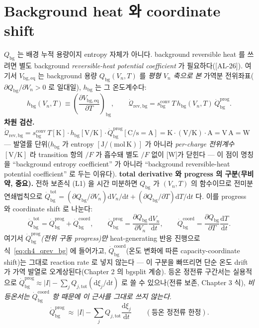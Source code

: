 \documentclass[11pt,a4paper]{article}
\newcommand{\dd}{\mathrm{d}}
\newcommand{\eq}{\mathrm{eq}}
\newcommand{\bg}{\mathrm{bg}}
\newcommand{\tot}{\mathrm{tot}}
\newcommand{\rev}{\mathrm{rev}}
\newcommand{\conv}{\mathrm{conv}}
\newcommand{\prog}{\mathrm{prog}}
\newcommand{\coord}{\mathrm{coord}}
\newcommand{\AL}[1]{\textsf{[AL-#1]}}
\begin{document}
\section{Background heat 와 coordinate shift}\label{sec:ch4_bg}
$Q_\bg$ 는 배경 누적 용량이지 entropy 자체가 아니다. background reversible heat 를 쓰려면 별도 background
\emph{reversible-heat potential coefficient} 가 필요하다(\AL{26}). 여기서 $V_{\bg,\eq}$ 는 background 용량
$Q_\bg(V_n,T)$ 를 \emph{평형 $V_n$ 축으로 본} 가역분 전위좌표($\partial Q_\bg/\partial V_n>0$ 로 일대일), $h_\bg$
는 그 온도계수다:
\begin{equation}
h_\bg(V_n,T)\equiv\left(\frac{\partial V_{\bg,\eq}}{\partial T}\right)_{\mathrm{bg}},\qquad
\dot{\mathcal Q}_{\rev,\bg}=s_\bg^{\conv}\,T\,h_\bg(V_n,T)\,\dot Q_\bg^{\prog}.
\label{eq:ch4_qrev_bg}
\end{equation}
\textbf{차원 검산.} $\dot{\mathcal Q}_{\rev,\bg}=s_\bg^{\conv}\,T[\mathrm K]\cdot h_\bg[\mathrm{V/K}]\cdot
\dot Q_\bg^{\prog}[\mathrm{C/s}=\mathrm A]=\mathrm{K\cdot(V/K)\cdot A}=\mathrm{V\,A}=\mathrm W$ — 발열률 단위($h_\bg$
가 entropy $[\mathrm{J/(mol\,K)}]$ 가 아니라 \emph{per-charge 전위계수} $[\mathrm{V/K}]$ 라 transition 항의 $/F$
가 흡수돼 별도 $/F$ 없이 [W]가 닫힌다 — 이 점이 명칭을 ``background entropy coefficient'' 가 아니라
``background reversible-heat potential coefficient'' 로 두는 이유다).
\textbf{total derivative 와 progress 의 구분(무비약, 중요).} 전하 보존식 (L1) 을 시간 미분하면 $Q_\bg$ 가
$(V_n,T)$ 의 함수이므로 전미분 연쇄법칙으로 $\dot Q_\bg^{\mathrm{tot}}=(\partial Q_\bg/\partial V_n)\dd V_n/\dd t
+(\partial Q_\bg/\partial T)\dd T/\dd t$ 다. 이를 progress 와 coordinate shift 로 나눈다:
\begin{equation}
\dot Q_\bg^{\mathrm{tot}}=\dot Q_\bg^{\prog}+\dot Q_\bg^{\coord},\qquad
\dot Q_\bg^{\prog}=\frac{\partial Q_\bg}{\partial V_n}\frac{\dd V_n}{\dd t},\qquad
\dot Q_\bg^{\coord}=\frac{\partial Q_\bg}{\partial T}\frac{\dd T}{\dd t}.
\label{eq:ch4_qbg_split}
\end{equation}
여기서 \emph{$\dot Q_\bg^{\prog}$(전위 구동 progress)만} heat-generating 반응 진행으로 식~\eqref{eq:ch4_qrev_bg}
에 들어가고, $\dot Q_\bg^{\coord}$(온도 변화에 따른 capacity-coordinate shift)는 그대로 reaction rate 로 넣지
않는다 — 이 구분을 빠뜨리면 단순 온도 drift 가 가역 발열로 오계상된다(Chapter 2 의 bgsplit 계승). 등온 정전류
구간서는 실용적으로 $\dot Q_\bg^{\prog}\approx|I|-\sum_j Q_{j,\tot}(\dd\xi_j/\dd t)$ 로 쓸 수 있으나(전류 보존,
Chapter 3 식), \emph{비등온서는 $\dot Q_\bg^{\coord}$ 항 때문에 이 근사를 그대로 쓰지 않는다}.
\begin{equation}
\dot Q_\bg^{\prog}\ \approx\ |I|-\sum_j Q_{j,\tot}\frac{\dd\xi_j}{\dd t}\qquad(\text{등온 정전류 한정}).
\label{eq:ch4_qbg_iso}
\end{equation}
\end{document}
